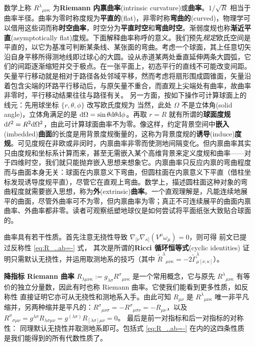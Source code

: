 数学上称 $R^\lambda{}_{\mu\nu\kappa}$ 为\textbf{Riemann 内禀曲率}(intrinsic curvature)或\textbf{曲率}。$1/\sqrt{R}$ 相当于曲率半径。曲率为零时称度规为\textbf{平直的}(flat)，非零时称\textbf{弯曲的}(curved)，物理学可以借用这些词而称\textbf{时空曲率}，时空分为\textbf{平直时空}和\textbf{弯曲时空}。渐弱度规也称\textbf{渐近平直}(asymptotically flat)度规。下面解释曲率称呼的意义。我们预先\textit{规定}欧氏空间是平直的，以它为基准可判断某条线、某张面的弯曲。考虑一个球面，其上任意切矢沿自身平移所得测地线即过球心的大圆。设从赤道某两处垂直延伸两条大圆弧，它们的间距逐渐缩短并交于极点。在一张平面上，初态平行的直线不可能改变间距。矢量平行移动就是相对于路径各处邻域平移，然而考虑将扇形围成圆锥面，矢量沿着包含尖端的环路平行移动后，与原矢量不重合，而直观上尖端处有曲率，故曲率非零时，平行移动结果往往与路径有关。
另一方面，按如下操作可计算球面上的线元：先用球坐标 $\{r,\theta,\phi\}$ 改写欧氏度规为
当然，此处 $\Omega$ 不是立体角(solid angle)，立体角满足的是 $\dd\Omega=\sin\theta \dd\theta\dd\phi$。再取 $r=R$ 就有所谓的\textbf{球面度规} $\dd\ell^2=R^2\dd\Omega^2$，由此可计算球面曲率不为零。像这样，约定背景空间中\textbf{嵌入}(imbedded)\textbf{曲面}的长度是用背景度规衡量的，这称为背景度规的\textbf{诱导}(induce)\textbf{度规}。可见度规在非欧或非闵时，内禀曲率非零而使测地间隔变化。但内禀曲率其实只由度规和坐标系计算而来，甚至无需嵌入某个高维背景来定义度规和曲率——对于四维时空，我们就只能抛弃嵌入思想来想象它。内禀曲率只反应内禀的弯曲程度而与曲面本身无关：球面在内禀意义下弯曲，但圆柱面在内禀意义下平直（借柱坐标发现诱导度规平直），尽管它在直观上弯曲。数学上，描述圆柱面这种对象的弯曲程度就需要嵌入思想，称为\textbf{外}(extrinsic)\textbf{曲率}。一个直观理解是，凡能连续地展平的曲面，尽管外曲率可不为零，但内禀曲率为零；真正不可连续展平的曲面内禀曲率、外曲率都非零。读者可观察纸塑地球仪是如何尝试将平面纸张大致贴合球面的。


曲率具有若干性质。首先注意无挠性导致 $\nabla_{[\nu}\nabla_{\kappa]}(V^\mu \omega_\mu)=0$，则可得
前文已提过反称性 \eqref{eq:R_..ab=-} 式，
其次是所谓的\textbf{Ricci 循环恒等式}(cyclic identities)
证明只需默认无挠性，并运用取测地系的技巧（其中 $\tilde R^\lambda{}_{\mu\nu\kappa}=-2\tilde \Gamma^\lambda_{\mu[\nu,\kappa]}$）。

\textbf{降指标 Riemann 曲率} $R_{\lambda\mu\nu\kappa}:=g_{\lambda\sigma}{R^\sigma}_{\mu\nu\kappa}$ 是一个常用概念，它与原先 ${R^\lambda}_{\mu\nu\kappa}$ 有等价的独立分量数，因此有时也称 Riemann 曲率。它使我们能看到更多性质，如反称性
直接证明它亦可从无挠性和测地系入手。由此可知
$R_{\mu\nu}$ 是 ${R^\lambda}_{\mu\nu\kappa}$ 唯一非平凡缩并，另两种缩并是平凡的：$R^\sigma{}_{\mu\nu\sigma}=-R^\sigma{}_{\mu\sigma\nu}=-R_{\mu\nu}$，以及 $R^\sigma{}_{\sigma\mu\nu}=g^{\lambda\sigma}R_{\lambda\sigma\mu\nu}=g^{(\lambda\sigma)}R_{[\lambda\sigma]\mu\nu}=0$。
最后是前一对指标和后一对指标的对称性：
同理默认无挠性并取测地系即可。包括式 \eqref{eq:R_..ab=-} 在内的这四条性质是我们能得到的所有代数性质了。

